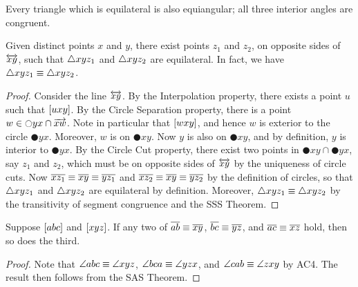 \begin{cor}
Every triangle which is equilateral is also equiangular; all three interior angles are congruent.
\end{cor}

\begin{construct}
Given distinct points \(x\) and \(y\), there exist points \(z_1\) and \(z_2\), on opposite sides of \(\overleftrightarrow{xy}\), such that \(\bigtriangleup{xyz_1}\) and \(\bigtriangleup{xyz_2}\) are equilateral.
In fact, we have \(\bigtriangleup{xyz_1} \equiv \bigtriangleup{xyz_2}\).
\end{construct}

\begin{proof}
Consider the line \(\overleftrightarrow{xy}\).
By the Interpolation property, there exists a point \(u\) such that \([ u x y ]\).
By the Circle Separation property, there is a point \(w \in \ocircle{yx} \cap \overrightarrow{xw}\).
Note in particular that \([ w x y ]\), and hence \(w\) is exterior to the circle \(\CIRCLE{y}{x}\).
Moreover, \(w\) is on \(\CIRCLE{x}{y}\).
Now \(y\) is also on \(\CIRCLE{x}{y}\), and by definition, \(y\) is interior to \(\CIRCLE{y}{x}\).
By the Circle Cut property, there exist two points in \(\CIRCLE{x}{y} \cap \CIRCLE{y}{x}\), say \(z_1\) and \(z_2\), which must be on opposite sides of \(\overleftrightarrow{xy}\) by the uniqueness of circle cuts.
Now \(\overline{xz_1} \equiv \overline{xy} \equiv \overline{yz_1}\) and \(\overline{xz_2} \equiv \overline{xy} \equiv \overline{yz_2}\) by the definition of circles, so that \(\bigtriangleup{xyz_1}\) and \(\bigtriangleup{xyz_2}\) are equilateral by definition.
Moreover, \(\bigtriangleup{xyz_1} \equiv \bigtriangleup{xyz_2}\) by the transitivity of segment congruence and the SSS Theorem.
\end{proof}

\begin{prop}
Suppose \([ a b c ]\) and \([ x y z ]\).
If any two of \(\overline{ab} \equiv \overline{xy}\), \(\overline{bc} \equiv \overline{yz}\), and \(\overline{ac} \equiv \overline{xz}\) hold, then so does the third.
\end{prop}

\begin{proof}
Note that \(\angle{abc} \equiv \angle{xyz}\), \(\angle{bca} \equiv \angle{yzx}\), and \(\angle{cab} \equiv \angle{zxy}\) by AC4.
The result then follows from the SAS Theorem.
\end{proof}

